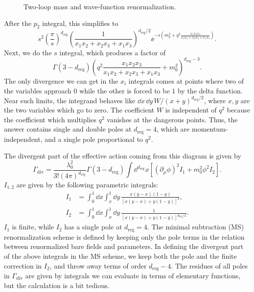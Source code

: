 \begin{figure}[htbp]
  \centering
  
  \caption{Two-loop mass and wave-function renormalization.}
  \label{fig:9.5}
\end{figure}

After the $p_2$ integral, this simplifies to
\[
  s^2\left(\frac{\pi}{s}\right)^{d_{\mathrm{reg}}}
  \left(\frac{1}{x_1x_2+x_2x_3+x_1x_3}\right)^{d_{\mathrm{reg}}/2}
  \ee^{-s\left(m_0^2+q^2\frac{x_1x_2x_3}{x_1x_2+x_2x_3+x_1x_3}\right)}.
\]
Next, we do the $s$ integral, which produces a factor of
\[
  \Gamma(3-d_{\mathrm{reg}})\left(q^2\frac{x_1x_2x_3}{x_1x_2+x_2x_3+x_1x_3}
  +m_0^2\right)^{d_{\mathrm{reg}}-3}.
\]
The only divergence we can get in the $x_i$ integrals comes at points where two
of the variables approach $0$ while the other is forced to be $1$ by the delta
function. Near such limits, the integrand behaves like
$\dd x\,\dd y\,W/(x+y)^{d_{\mathrm{reg}}/2}$,
where $x,y$ are the two variables which go to zero. The coefficient $W$ is
independent of $q^2$ because the coefficient which multiplies $q^2$ vanishes at
the dangerous points. Thus, the answer contains single and double poles at
$d_{\mathrm{reg}}=4$, which are momentum-independent, and a single pole proportional to $q^2$.

The divergent part of the effective action coming from this diagram is given by
\[
  \Gamma_{\mathrm{div}}=\frac{\lambda_0^2}{3!(4\pi)^{d_{\mathrm{reg}}}}
  \Gamma(3-d_{\mathrm{reg}})
  \int\dd^{d_{\mathrm{reg}}}x\left[(\partial_\mu\phi)^2I_1+m_0^2\phi^2I_2\right].
\]
$I_{1,2}$ are given by the following parametric integrals:
\[
  \begin{aligned}
  I_1&=\int_0^1\dd x\int_x^1\dd y\,
  \frac{x(y-x)(1-y)}{[x(y-x)+y(1-y)]^3},\\
  I_2&=\int_0^1\dd x\int_x^1\dd y\,
  \frac{1}{[x(y-x)+y(1-y)]^{d_{\mathrm{reg}}/2}}.
  \end{aligned}
\]
$I_1$ is finite, while $I_2$ has a single pole at $d_{\mathrm{reg}}=4$. The minimal
subtraction (MS) renormalization scheme is defined by keeping only the pole
terms in the relation between renormalized bare fields and parameters. In
defining the divergent part of the above integrals in the MS scheme, we keep
both the pole and the finite correction in $I_2$, and throw away terms of order
$d_{\mathrm{reg}}-4$. The residues of all poles in $\Gamma_{\mathrm{div}}$ are given by
integrals we can evaluate in terms of elementary functions, but the calculation
is a bit tedious.

